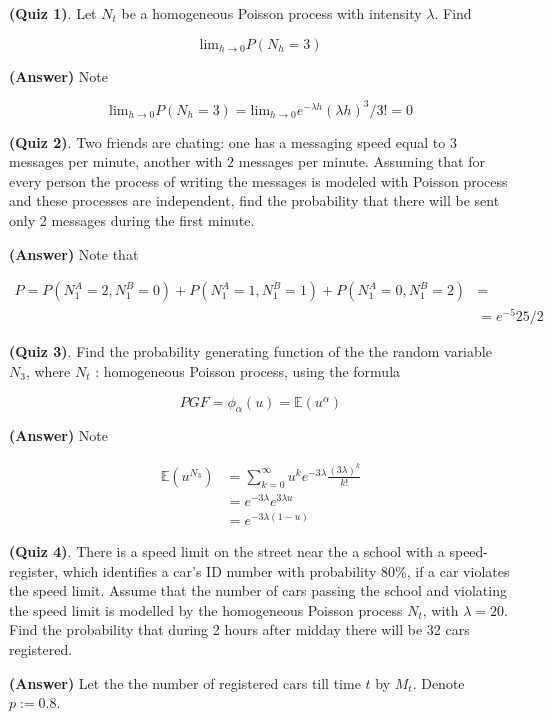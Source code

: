 \documentclass[12pt]{article}
\theoremstyle{nonumberbreak}
\begin{document}
\textbf{(Quiz 1)}. Let $N_t$ be a homogeneous Poisson process with intensity $\lambda$. Find

$$
\mathrm{lim}_{h\to0} P(N_h = 3)
$$

\textbf{(Answer)} Note

$$
\mathrm{lim}_{h\to0} P(N_h = 3) = \mathrm{lim}_{h\to0} e^{-\lambda h} (\lambda h)^3/3! = 0
$$


\textbf{(Quiz 2)}. Two friends are chating: one has a messaging speed equal to $3$ messages per minute, another with $2$ messages per minute. Assuming that for every person the process of writing the messages is modeled with Poisson process and these processes are independent, find the probability that there will be sent only 2 messages during the first minute.

\textbf{(Answer)} Note that

$$
\begin{aligned}
P = P(N_1^A = 2, N_1^B = 0) + P(N_1^A = 1, N_1^B = 1) + P(N_1^A = 0, N_1^B = 2) &= \\[8pt]
&= e^{-5} 25/2
\end{aligned}
$$



\textbf{(Quiz 3)}. Find the probability generating function of the the random variable $N_3$, where $N_t$ : homogeneous Poisson process, using the formula 

$$
PGF = \phi_\alpha (u) = \mathbb{E}(u^\alpha)
$$

\textbf{(Answer)} Note

$$
\begin{aligned}
\mathbb{E}(u^{N_3}) &= \sum_{k=0}^\infty u^k e^{-3\lambda} \frac{(3\lambda)^k}{k!} \\[8pt]
&= e^{-3\lambda} e^{3\lambda u} \\[8pt]
&= e^{-3\lambda(1-u)}
\end{aligned}
$$



\textbf{(Quiz 4)}. There is a speed limit on the street near the a school with a speed-register, which identifies a car's ID number with probability 80\%, if a car violates the speed limit. Assume that the number of cars passing the school and violating the speed limit is modelled by the homogeneous Poisson process $N_t$, with $\lambda=20$. Find the probability that during 2 hours after midday there will be 32 cars registered.


\textbf{(Answer)} Let the the number of registered cars till time $t$ by $M_t$. Denote $p := 0.8$. 
\end{document}
